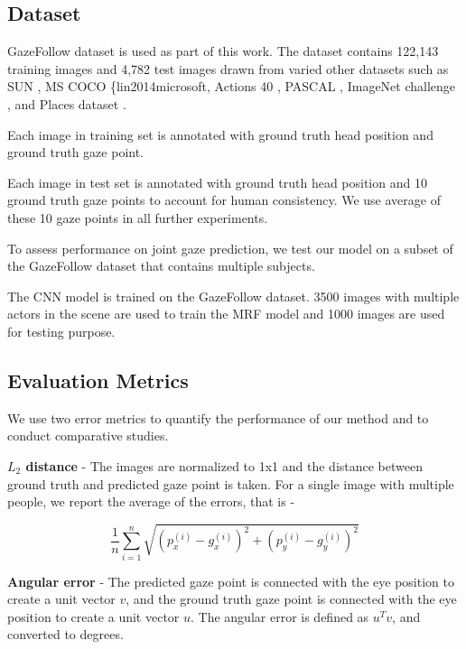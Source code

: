 \documentclass[10pt,twocolumn,letterpaper]{article}
\begin{document}
\subsection{Dataset}

GazeFollow dataset \cite{nips15_recasens} is used as part of this work. The dataset contains 122,143 training images and 4,782 test images drawn from varied other datasets such as SUN \cite{xiao2010sun}, MS COCO \{lin2014microsoft, Actions 40 \cite{yao2011human}, PASCAL \cite{everingham2010pascal}, ImageNet challenge \cite{russakovsky2015imagenet}, and Places dataset \cite{zhou2014learning}.

Each image in training set is annotated with ground truth head position and ground truth gaze point.

Each image in test set is annotated with ground truth head position and 10 ground truth gaze points to account for human consistency. We use average of these 10 gaze points in all further experiments.

To assess performance on joint gaze prediction, we test our model on a subset of the GazeFollow dataset that contains multiple subjects.

The CNN model \cite{nips15_recasens} is trained on the GazeFollow dataset. 3500 images with multiple actors in the scene are used to train the MRF model and 1000 images are used for testing purpose.

\subsection{Evaluation Metrics}

We use two error metrics to quantify the performance of our method and to conduct comparative studies.

\textbf{$L_2$ distance} - The images are normalized to 1x1 and the distance between ground truth and predicted gaze point is taken. For a single image with multiple people, we report the average of the errors, that is -

\begin{equation}
\frac{1}{n} \sum_{i=1}^n \sqrt{(p_x^{(i)} - g_x^{(i)})^2 + (p_y^{(i)} - g_y^{(i)})^2}
\end{equation}

\textbf{Angular error} - The predicted gaze point is connected with the eye position to create a unit vector $v$, and the ground truth gaze point is connected with the eye position to create a unit vector $u$. The angular error is defined as $u^T v$, and converted to degrees.
\end{document}
